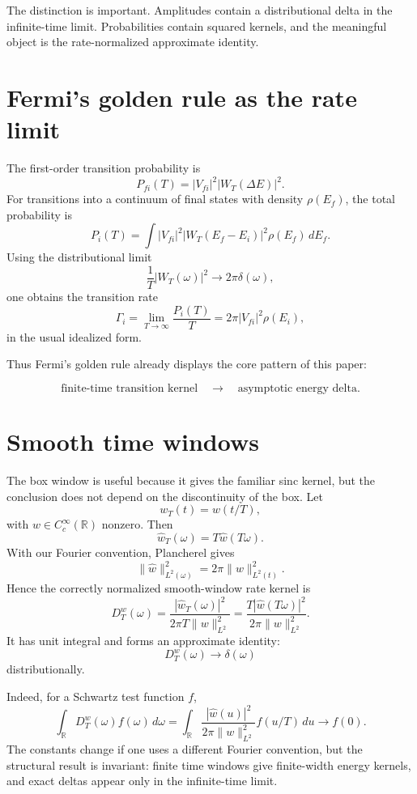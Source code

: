 \documentclass[11pt]{article}
\begin{document}
The distinction is important.  Amplitudes contain a distributional delta in the infinite-time limit.  Probabilities contain squared kernels, and the meaningful object is the rate-normalized approximate identity.

\section{Fermi's golden rule as the rate limit}

The first-order transition probability is
\[
P_{fi}(T)=|V_{fi}|^2 |W_T(\Delta E)|^2.
\]
For transitions into a continuum of final states with density \(\rho(E_f)\), the total probability is
\[
P_i(T)=\int |V_{fi}|^2 |W_T(E_f-E_i)|^2\rho(E_f)\,dE_f.
\]
Using the distributional limit
\[
\frac{1}{T}|W_T(\omega)|^2\to 2\pi\delta(\omega),
\]
one obtains the transition rate
\[
\Gamma_i
=
\lim_{T\to\infty}\frac{P_i(T)}{T}
=
2\pi |V_{fi}|^2\rho(E_i),
\]
in the usual idealized form.

Thus Fermi's golden rule already displays the core pattern of this paper:

\[
\boxed{\text{finite-time transition kernel}\quad\longrightarrow\quad\text{asymptotic energy delta}.}
\]

\section{Smooth time windows}

The box window is useful because it gives the familiar sinc kernel, but the conclusion does not depend on the discontinuity of the box.  Let
\[
w_T(t)=w(t/T),
\]
with \(w\in C_c^\infty(\mathbb R)\) nonzero.  Then
\[
\widehat w_T(\omega)=T\widehat w(T\omega).
\]
With our Fourier convention, Plancherel gives
\[
\|\widehat w\|_{L^2(\omega)}^2=2\pi\|w\|_{L^2(t)}^2.
\]
Hence the correctly normalized smooth-window rate kernel is
\[
D_T^w(\omega)
=
\frac{|\widehat w_T(\omega)|^2}{2\pi T\|w\|_{L^2}^2}
=
\frac{T|\widehat w(T\omega)|^2}{2\pi \|w\|_{L^2}^2}.
\]
It has unit integral and forms an approximate identity:
\[
D_T^w(\omega)\to \delta(\omega)
\]
distributionally.

Indeed, for a Schwartz test function \(f\),
\[
\int_{\mathbb R}D_T^w(\omega)f(\omega)\,d\omega
=
\int_{\mathbb R}
\frac{|\widehat w(u)|^2}{2\pi\|w\|_{L^2}^2}
f(u/T)\,du
\to f(0).
\]
The constants change if one uses a different Fourier convention, but the structural result is invariant: finite time windows give finite-width energy kernels, and exact deltas appear only in the infinite-time limit.
\end{document}
